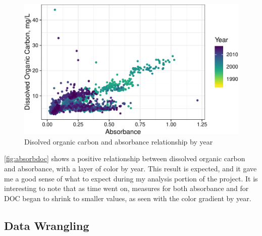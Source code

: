 \documentclass[12pt,]{article}
\newenvironment{Shaded}{\begin{snugshade}}{\end{snugshade}}
\newcommand{\KeywordTok}[1]{\textcolor[rgb]{0.13,0.29,0.53}{\textbf{#1}}}
\newcommand{\StringTok}[1]{\textcolor[rgb]{0.31,0.60,0.02}{#1}}
\newcommand{\OperatorTok}[1]{\textcolor[rgb]{0.81,0.36,0.00}{\textbf{#1}}}
\newcommand{\NormalTok}[1]{#1}
\begin{document}
\begin{figure}
\centering
\includegraphics{Bash_ENV872_Project_files/figure-latex/absorbdoc-1.pdf}
\caption{\label{fig:absorbdoc} Disolved organic carbon and absorbance
relationship by year}
\end{figure}

\autoref{fig:absorbdoc} shows a positive relationship between dissolved
organic carbon and absorbance, with a layer of color by year. This
result is expected, and it gave me a good sense of what to expect during
my analysis portion of the project. It is interesting to note that as
time went on, measures for both absorbance and for DOC began to shrink
to smaller values, as seen with the color gradient by year.

\subsection{Data Wrangling}\label{data-wrangling}

\begin{Shaded}
\end{Shaded}
\end{document}
